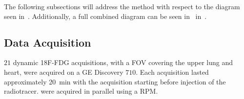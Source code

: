             The following subsections will address the method with respect to the diagram seen in~. Additionally, a full combined diagram can be seen in~ in~.
            
            \subsection{Data Acquisition} \label{sec:pca_data_driven_surrogate_signal_extraction_methods_for_dynamic_pet_methods_data_acquisition}
                $21$ dynamic \gls{18F-FDG} acquisitions, with a \gls{FOV} covering the upper lung and heart, were acquired on a \gls{GE} Discovery $710$. Each acquisition lasted approximately \SI{20}{\minute} with the acquisition starting before injection of the radiotracer.  were acquired in parallel using a \gls{RPM}.
                
